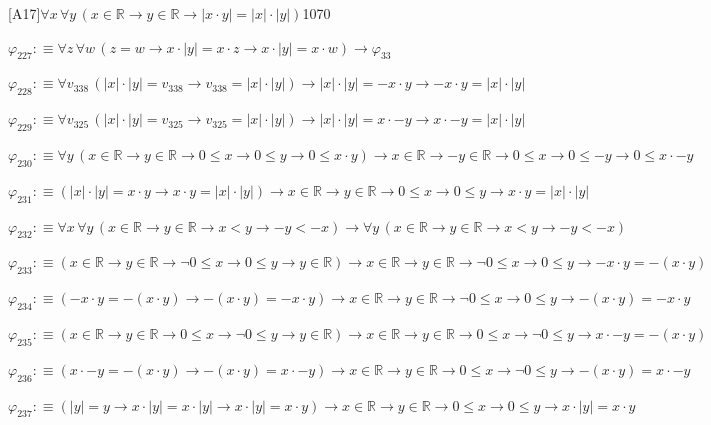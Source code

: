 \begin{fullproof}{[A17]}{$\forall x\,\forall y\,(x \in \mathbb{R} \to y \in \mathbb{R} \to \lvert x \cdot y \rvert = \lvert x \rvert \cdot \lvert y \rvert)$}{1070}
\begin{abbrevlist}
\item $\varphi_{227} :\equiv \forall z\,\forall w\,(z = w \to x \cdot \lvert y \rvert = x \cdot z \to x \cdot \lvert y \rvert = x \cdot w) \to \varphi_{33}$
\item $\varphi_{228} :\equiv \forall v_{338}\,(\lvert x \rvert \cdot \lvert y \rvert = v_{338} \to v_{338} = \lvert x \rvert \cdot \lvert y \rvert) \to \lvert x \rvert \cdot \lvert y \rvert = -x \cdot y \to -x \cdot y = \lvert x \rvert \cdot \lvert y \rvert$
\item $\varphi_{229} :\equiv \forall v_{325}\,(\lvert x \rvert \cdot \lvert y \rvert = v_{325} \to v_{325} = \lvert x \rvert \cdot \lvert y \rvert) \to \lvert x \rvert \cdot \lvert y \rvert = x \cdot -y \to x \cdot -y = \lvert x \rvert \cdot \lvert y \rvert$
\item $\varphi_{230} :\equiv \forall y\,(x \in \mathbb{R} \to y \in \mathbb{R} \to 0 \leq x \to 0 \leq y \to 0 \leq x \cdot y) \to x \in \mathbb{R} \to -y \in \mathbb{R} \to 0 \leq x \to 0 \leq -y \to 0 \leq x \cdot -y$
\item $\varphi_{231} :\equiv (\lvert x \rvert \cdot \lvert y \rvert = x \cdot y \to x \cdot y = \lvert x \rvert \cdot \lvert y \rvert) \to x \in \mathbb{R} \to y \in \mathbb{R} \to 0 \leq x \to 0 \leq y \to x \cdot y = \lvert x \rvert \cdot \lvert y \rvert$
\item $\varphi_{232} :\equiv \forall x\,\forall y\,(x \in \mathbb{R} \to y \in \mathbb{R} \to x < y \to -y < -x) \to \forall y\,(x \in \mathbb{R} \to y \in \mathbb{R} \to x < y \to -y < -x)$
\item $\varphi_{233} :\equiv (x \in \mathbb{R} \to y \in \mathbb{R} \to \neg 0 \leq x \to 0 \leq y \to y \in \mathbb{R}) \to x \in \mathbb{R} \to y \in \mathbb{R} \to \neg 0 \leq x \to 0 \leq y \to -x \cdot y = -(x \cdot y)$
\item $\varphi_{234} :\equiv (-x \cdot y = -(x \cdot y) \to -(x \cdot y) = -x \cdot y) \to x \in \mathbb{R} \to y \in \mathbb{R} \to \neg 0 \leq x \to 0 \leq y \to -(x \cdot y) = -x \cdot y$
\item $\varphi_{235} :\equiv (x \in \mathbb{R} \to y \in \mathbb{R} \to 0 \leq x \to \neg 0 \leq y \to y \in \mathbb{R}) \to x \in \mathbb{R} \to y \in \mathbb{R} \to 0 \leq x \to \neg 0 \leq y \to x \cdot -y = -(x \cdot y)$
\item $\varphi_{236} :\equiv (x \cdot -y = -(x \cdot y) \to -(x \cdot y) = x \cdot -y) \to x \in \mathbb{R} \to y \in \mathbb{R} \to 0 \leq x \to \neg 0 \leq y \to -(x \cdot y) = x \cdot -y$
\item $\varphi_{237} :\equiv (\lvert y \rvert = y \to x \cdot \lvert y \rvert = x \cdot \lvert y \rvert \to x \cdot \lvert y \rvert = x \cdot y) \to x \in \mathbb{R} \to y \in \mathbb{R} \to 0 \leq x \to 0 \leq y \to x \cdot \lvert y \rvert = x \cdot y$

\end{abbrevlist}
\end{fullproof}
